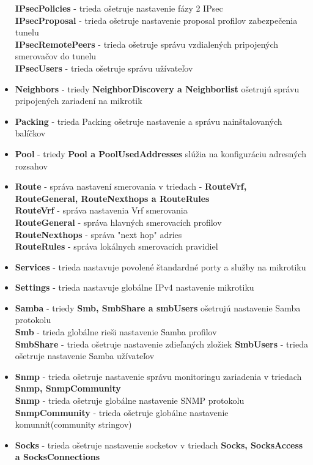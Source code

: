 \begin{itemize}
\textbf{IPsecPolicies} - trieda ošetruje nastavenie fázy 2 IPsec\\
\textbf{IPsecProposal} - trieda ošetruje nastavenie proposal profilov zabezpečenia tunelu\\
\textbf{IPsecRemotePeers} - trieda ošetruje správu vzdialených pripojených smerovačov do tunelu\\
\textbf{IPsecUsers} - trieda ošetruje správu užívateľov
\item \textbf{Neighbors} - triedy \textbf{NeighborDiscovery a Neighborlist} ošetrujú správu pripojených zariadení na mikrotik
\item \textbf{Packing} - trieda Packing ošetruje nastavenie a správu nainštalovaných balíčkov
\item \textbf{Pool} - triedy \textbf{Pool a PoolUsedAddresses} slúžia na konfiguráciu adresných rozsahov
\item \textbf{Route} - správa nastavení smerovania v triedach - \textbf{RouteVrf, RouteGeneral, RouteNexthops a RouteRules}\\
\textbf{RouteVrf} - správa nastavenia Vrf smerovania\\
\textbf{RouteGeneral} - správa hlavných smerovacích profilov\\
\textbf{RouteNexthops} - správa "next hop" adries\\
\textbf{RouteRules} - správa lokálnych smerovacích pravidiel
\item \textbf{Services} - trieda nastavuje povolené štandardné porty a služby na mikrotiku
\item \textbf{Settings} - trieda nastavuje globálne IPv4 nastavenie mikrotiku
\item \textbf{Samba} - triedy \textbf{Smb, SmbShare a smbUsers} ošetrujú nastavenie Samba protokolu\\
\textbf{Smb} - trieda globálne rieši nastavenie Samba profilov\\
\textbf{SmbShare} - trieda ošetruje nastavenie zdieľaných zložiek
\textbf{SmbUsers} - trieda ošetruje nastavenie Samba užívateľov
\item \textbf{Snmp} - trieda ošetruje nastavenie správu monitoringu zariadenia v triedach \textbf{Snmp, SnmpCommunity}\\
\textbf{Snmp} - trieda ošetruje globálne nastavenie SNMP protokolu\\
\textbf{SnmpCommunity} - trieda ošetruje globálne nastavenie komunnít(community stringov)
\item \textbf{Socks} - trieda ošetruje nastavenie socketov v triedach \textbf{Socks, SocksAccess a SocksConnections}

\end{itemize}
